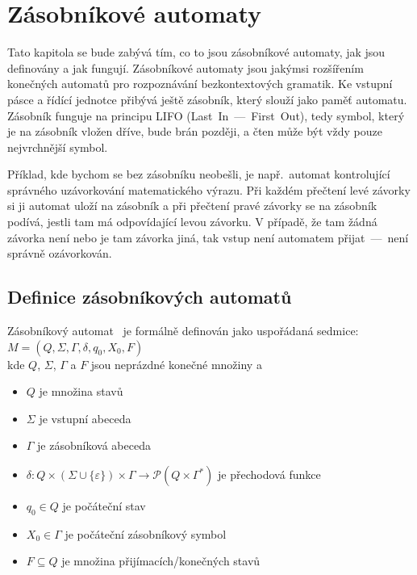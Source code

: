 \chapter{Zásobníkové automaty}\label{chap:PushdownAutomata}

Tato kapitola se bude zabývá tím, co to jsou zásobníkové automaty, jak jsou definovány a jak fungují. Zásobníkové automaty jsou jakýmsi rozšířením konečných automatů pro rozpoznávání bezkontextových gramatik. Ke vstupní pásce a řídící jednotce přibývá ještě zásobník, který slouží jako paměť automatu. Zásobník funguje na principu LIFO (Last~In~---~First~Out), tedy symbol, který je na zásobník vložen dříve, bude brán později, a čten může být vždy pouze nejvrchnější symbol.

Příklad, kde bychom se bez zásobníku neobešli, je např.~automat kontrolující správného uzávorkování matematického výrazu. Při každém přečtení levé závorky si ji automat uloží na zásobník a při přečtení pravé závorky se na zásobník podívá, jestli tam má odpovídající levou závorku. V případě, že tam žádná závorka není nebo je tam závorka jiná, tak vstup není automatem přijat~---~není správně ozávorkován.

\section{Definice zásobníkových automatů}\label{sec:DefinitonOfPDA}

Zásobníkový automat~\cite{Sipserc2006}  je formálně definován jako uspořádaná sedmice:\\
\indent\emph{$M = (Q, \Sigma, \Gamma, \delta, q_0, X_0, F)$}\\
kde $Q$, $\Sigma$, $\Gamma$ a $F$ jsou neprázdné konečné množiny a 

\begin{itemize}
    \item $Q$ je množina stavů
    \item $\Sigma$ je vstupní abeceda
    \item $\Gamma$ je zásobníková abeceda
    \item $\delta : Q \times (\Sigma \cup \{\varepsilon\}) \times \Gamma \rightarrow \mathcal{P}(Q \times \Gamma^*)$ je přechodová funkce
    \item $q_0 \in Q$ je počáteční stav
    \item $X_0 \in \Gamma$ je počáteční zásobníkový symbol
    \item $F \subseteq Q$ je množina přijímacích/konečných stavů
\end{itemize}

